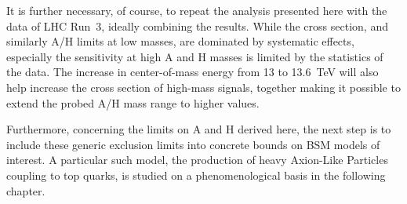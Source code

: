 It is further necessary, of course, to repeat the analysis presented here with the data of LHC Run~3, ideally combining the results. While the \etat cross section, and similarly A/H limits at low masses, are dominated by systematic effects, especially the sensitivity at high A and H masses is limited by the statistics of the data. The increase in center-of-mass energy from 13 to \SI{13.6}{\TeV} will also help increase the cross section of high-mass signals, together making it possible to extend the probed A/H mass range to higher values.

Furthermore, concerning the limits on A and H derived here, the next step is to include these generic exclusion limits into concrete bounds on BSM models of interest. A particular such model, the production of heavy Axion-Like Particles coupling to top quarks, is studied on a phenomenological basis in the following chapter.

